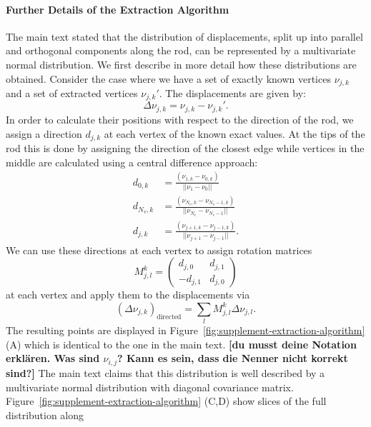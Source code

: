 \documentclass[10pt,letterpaper]{article}
\begin{document}
\paragraph*{Further Details of the Extraction Algorithm}
\label{sec:supplement-extraction-algorithm}
The main text stated that the distribution of displacements, split up into parallel and orthogonal
components along the rod, can be represented by a multivariate normal distribution.
We first describe in more detail how these distributions are obtained.
Consider the case where we have a set of exactly known vertices $\nu_{j,k}$ and a set of extracted
vertices $\nu_{j,k}'$.
The displacements are given by:
\begin{equation}
    \Delta \nu_{j,k} = \nu_{j,k} - \nu_{j,k}'.
\end{equation}
In order to calculate their positions with respect to the direction of the rod, we assign a
direction $d_{j,k}$ at each vertex of the known exact values.
At the tips of the rod this is done by assigning the direction of the closest edge while vertices in
the middle are calculated using a central difference approach:
\begin{align}
    d_{0,k} &= \frac{(\nu_{1,k}-\nu_{0,k})}{||\nu_1 - \nu_0||}\\
    d_{N_v,k} &= \frac{(\nu_{N_v,k}-\nu_{N_v-1,k})}{||\nu_{N_v} - \nu_{N_v-1}||}\\
    d_{j,k} &= \frac{(\nu_{j+1,k}-\nu_{j-1,k})}{||\nu_{j+1} - \nu_{j-1}||}.
\end{align}
We can use these directions at each vertex to assign rotation matrices
\begin{equation}
    M_{j,l}^k = \begin{pmatrix}
        d_{j,0} & d_{j,1}\\
        -d_{j,1} & d_{j,0}
    \end{pmatrix}
\end{equation}
at each vertex and apply them to the displacements via
\begin{equation}
    (\Delta\nu_{j,k})_\text{directed} = \sum\limits_l M_{j,l}^k \Delta\nu_{j,l}.
\end{equation}
The resulting points are displayed in Figure~\ref{fig:supplement-extraction-algorithm} (A) which is
identical to the one in the main text.
{\bf [du musst deine Notation erklären. Was sind $\nu_{i,j}$? Kann es sein, dass die Nenner nicht korrekt sind?]}
The main text claims that this distribution is well described by a multivariate normal distribution
with diagonal covariance matrix.
Figure~\ref{fig:supplement-extraction-algorithm} (C,D) show slices of the full distribution along
\end{document}
